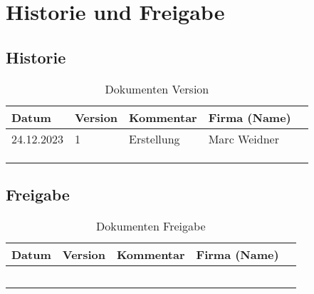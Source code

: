 \pagebreak

\section{Historie und Freigabe}
\subsection{Historie}
\begin{table}[htb]
\begin{tabularx}{1\textwidth}{@{}|l|X|X|X|X|@{}}
	\hline
	\rowcolor{lightgray}\textbf{}Datum & Version & Kommentar & Firma (Name) \\ \hline
	24.12.2023 & 1 & Erstellung & Marc Weidner\\ \hline
	& & & \\ \hline
	& & & \\ \hline
	& & & \\ \hline
\end{tabularx}
\caption{Dokumenten Version}
\label{dv}
\end{table}

\subsection{Freigabe}
\begin{table}
	\begin{tabularx}{1\textwidth}{@{}|l|X|X|X|X|@{}}
	\hline
	\rowcolor{lightgray}\textbf{}Datum & Version & Kommentar & Firma (Name) \\ \hline
	\textbf{} & & & \\ \hline
	\textbf{} & & & \\ \hline
	\textbf{} & & & \\ \hline
	\textbf{} & & & \\ \hline
	\textbf{} & & & \\ \hline
\end{tabularx}
\caption{Dokumenten Freigabe}
\label{df}
\end{table}
